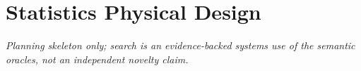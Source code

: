 \section{Statistics Physical Design}
\textit{Planning skeleton only; search is an evidence-backed systems use of
the semantic oracles, not an independent novelty claim.}

